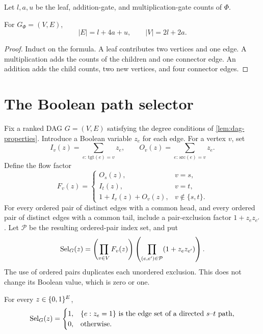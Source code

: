 Let \(l,a,u\) be the leaf, addition-gate, and multiplication-gate counts of \(\Phi\).

\begin{lemma}\label{lem:graph-counts}
For \(G_\Phi=(V,E)\),
\[
  |E|=l+4a+u,
  \qquad
  |V|=2l+2a.
\]
\end{lemma}

\begin{proof}
Induct on the formula.  A leaf contributes two vertices and one edge.  A multiplication
adds the counts of the children and one connector edge.  An addition adds the child counts,
two new vertices, and four connector edges.
\end{proof}

\section{The Boolean path selector}\label{sec:selector}

Fix a ranked DAG \(G=(V,E)\) satisfying the degree conditions of
\cref{lem:dag-properties}.  Introduce a Boolean variable \(z_e\) for each edge.  For a
vertex \(v\), set
\[
 I_v(z)=\sum_{e:\,\mathrm{tgt}(e)=v}z_e,
 \qquad
 O_v(z)=\sum_{e:\,\mathrm{src}(e)=v}z_e.
\]
Define the flow factor
\[
 F_v(z)=
 \begin{cases}
   O_s(z),&v=s,\\
   I_t(z),&v=t,\\
   1+I_v(z)+O_v(z),&v\notin\{s,t\}.
 \end{cases}
\]
For every ordered pair of distinct edges with a common head, and every ordered pair of
distinct edges with a common tail, include a pair-exclusion factor \(1+z_ez_{e'}\).  Let
\(\mathcal P\) be the resulting ordered-pair index set, and put
\[
 \operatorname{Sel}_G(z)=
 \left(\prod_{v\in V}F_v(z)\right)
 \left(\prod_{(e,e')\in\mathcal P}(1+z_ez_{e'})\right).
\]
The use of ordered pairs duplicates each unordered exclusion.  This does not change its
Boolean value, which is zero or one.

\begin{proposition}\label{prop:selector}
For every \(z\in\{0,1\}^E\),
\[
 \operatorname{Sel}_G(z)=
 \begin{cases}
  1,&\{e:z_e=1\}\text{ is the edge set of a directed }s\text{--}t\text{ path},\\
  0,&\text{otherwise}.
 \end{cases}
\]
\end{proposition}

